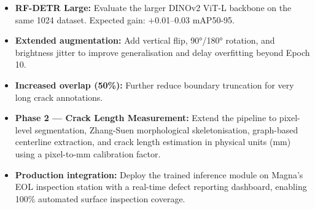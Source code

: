 \begin{itemize}[leftmargin=2em]
    \item \textbf{RF-DETR Large:} Evaluate the larger DINOv2 ViT-L backbone on the same 1024 dataset. Expected gain: $+$0.01--0.03 mAP50-95.
    \item \textbf{Extended augmentation:} Add vertical flip, 90°/180° rotation, and brightness jitter to improve generalisation and delay overfitting beyond Epoch 10.
    \item \textbf{Increased overlap (50\%):} Further reduce boundary truncation for very long crack annotations.
    \item \textbf{Phase 2 --- Crack Length Measurement:} Extend the pipeline to pixel-level segmentation, Zhang-Suen morphological skeletonisation, graph-based centerline extraction, and crack length estimation in physical units (mm) using a pixel-to-mm calibration factor.
    \item \textbf{Production integration:} Deploy the trained inference module on Magna's EOL inspection station with a real-time defect reporting dashboard, enabling 100\% automated surface inspection coverage.
\end{itemize}
